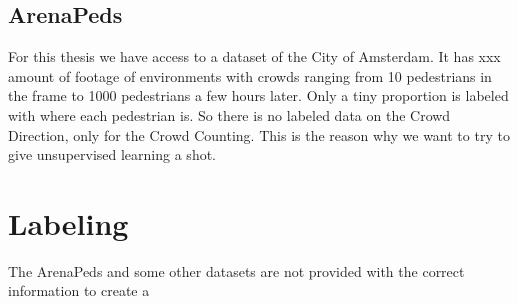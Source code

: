 \subsection{ArenaPeds}
For this thesis we have access to a dataset of the City of Amsterdam. It has xxx amount of footage of environments with crowds ranging from 10 pedestrians in the frame to 1000 pedestrians a few hours later. Only a tiny proportion is labeled with where each pedestrian is. So there is no labeled data on the Crowd Direction, only for the Crowd Counting. This is the reason why we want to try to give unsupervised learning a shot.


\section{Labeling}
The ArenaPeds and some other datasets are not provided with the correct information to create a